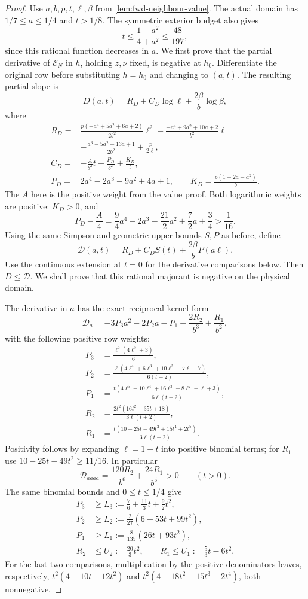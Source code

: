 \begin{proof}
Use $a,b,p,t,\ell,\beta$ from \cref{lem:fwd-neighbour-value}.
The actual domain has $1/7\leq a\leq1/4$ and $t>1/8$.
The symmetric exterior budget also gives
\[
 t\leq\frac{1-a^2}{4+a^2}\leq\frac{48}{197},
\]
since this rational function decreases in $a$.
We first prove that the partial derivative of $\mathcal E_N$ in $h$,
holding $z,\nu$ fixed, is negative at $h_0$. Differentiate the original
row before substituting $h=h_0$ and changing to $(a,t)$.
The resulting partial slope is
\[
 D(a,t)=R_D+C_D\log\ell+\frac{2\beta}b\log\beta,
\]
where
\begin{align*}
 R_D={}&\frac{p(-a^4+5a^2+6a+2)}{2b^2}\ell^2
       -\frac{-a^4+9a^2+10a+2}{b^2}\ell\\
      &-\frac{a^3-5a^2-13a+1}{2b^2}+\frac p{2\ell},\\
 C_D={}&-\frac A{b^2}t+\frac{P_D}{b^2}+\frac{K_D}t,\\
 P_D={}&2a^4-2a^3-9a^2+4a+1,\qquad
 K_D=\frac{p(1+2a-a^2)}b.
\end{align*}
The $A$ here is the positive weight from the value proof.
Both logarithmic weights are positive: $K_D>0$, and
\[
 P_D-\frac A4
 =\frac94a^4-2a^3-\frac{21}2a^2+\frac72a+\frac34>\frac1{16}.
\]
Using the same Simpson and geometric upper bounds $S,P$ as before,
define
\[
 \mathcal D(a,t)=R_D+C_DS(t)+\frac{2\beta}bP(a\ell).
\]
Use the continuous extension at $t=0$ for the derivative comparisons below.
Then $D\leq\mathcal D$. We shall prove that this rational majorant is
negative on the physical domain.

The derivative in $a$ has the exact reciprocal-kernel form
\[
 \mathcal D_a=-3P_3a^2-2P_2a-P_1+\frac{2R_2}{b^3}+\frac{R_1}{b^2},
\]
with the following positive row weights:
\begin{align*}
 P_3&=\frac{\ell^2(4\ell^2+3)}6,\\
 P_2&=\frac{\ell(4\ell^4+6\ell^3+10\ell^2-7\ell-7)}{6(t+2)},\\
 P_1&=\frac{t(4\ell^5+10\ell^4+16\ell^3-8\ell^2+\ell+3)}
                  {6\ell(t+2)},\\
 R_2&=\frac{2t^2(16t^2+35t+18)}{3\ell(t+2)},\\
 R_1&=\frac{t(10-25t-49t^2+15t^4+2t^5)}{3\ell(t+2)}.
\end{align*}
Positivity follows by expanding $\ell=1+t$ into positive binomial
terms; for $R_1$ use $10-25t-49t^2\geq11/16$.
In particular
\[
 \mathcal D_{aaaa}=\frac{120R_2}{b^6}+\frac{24R_1}{b^5}>0\qquad(t>0).
\]
The same binomial bounds and $0\leq t\leq1/4$ give
\begin{align*}
 P_3&\geq L_3:=\frac76+\frac{11}3t+\frac92t^2,\\
 P_2&\geq L_2:=\frac2{27}(6+53t+99t^2),\\
 P_1&\geq L_1:=\frac8{135}(26t+93t^2),\\
 R_2&\leq U_2:=\frac{20}3t^2,\qquad
 R_1\leq U_1:=\frac53t-6t^2.
\end{align*}
For the last two comparisons, multiplication by the positive
denominators leaves, respectively,
$t^2(4-10t-12t^2)$ and $t^2(4-18t^2-15t^3-2t^4)$, both nonnegative.


\end{proof}

